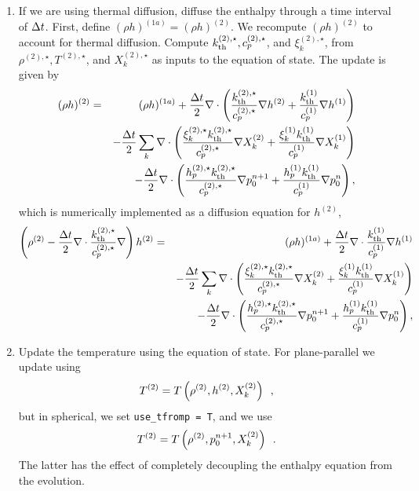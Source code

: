 \begin{description}
\begin{enumerate}
\item If we are using thermal diffusion, diffuse the enthalpy through a time interval of 
$\Delta t$.  First, define $(\rho h)^{(1a)} = (\rho h)^{(2)}$.  We recompute $(\rho h)^{(2)}$ to 
account for thermal diffusion.  Compute $k_{\rm th}^{(2),\star}, c_p^{(2),\star}$, and 
$\xi_k^{(2),\star}$, from $\rho^{(2),\star}, T^{(2),\star}$, and $X_k^{(2),\star}$ as inputs to 
the equation of state.  The update is given by
\begin{eqnarray}
(\rho h)^{(2)} &=& (\rho h)^{(1a)} + \frac{\Delta t}{2}\nabla\cdot\left(\frac{k_{\rm th}^{(2),\star}}{c_p^{(2),\star}}\nabla h^{(2)} + \frac{k_{\rm th}^{(1)}}{c_p^{(1)}}\nabla h^{(1)}\right)\nonumber\\
&&- \frac{\Delta t}{2}\sum_k\nabla\cdot\left(\frac{\xi_k^{(2),\star}k_{\rm th}^{(2),\star}}{c_p^{(2),\star}}\nabla X_k^{(2)} + \frac{\xi_k^{(1)}k_{\rm th}^{(1)}}{c_p^{(1)}}\nabla X_k^{(1)}\right)\nonumber\\
&&- \frac{\Delta t}{2}\nabla\cdot\left(\frac{h_p^{(2),\star}k_{\rm th}^{(2),\star}}{c_p^{(2),\star}}\nabla p_0^{n+1} + \frac{h_p^{(1)}k_{\rm th}^{(1)}}{c_p^{(1)}}\nabla p_0^{n}\right),
\end{eqnarray}
which is numerically implemented as a diffusion equation for $h^{(2)}$,
\begin{eqnarray}
\left(\rho^{(2)} - \frac{\Delta t}{2}\nabla\cdot\frac{k_{\rm th}^{(2),\star}}{c_p^{(2),\star}}\nabla\right)h^{(2)} &=& (\rho h)^{(1a)} + \frac{\Delta t}{2}\nabla\cdot\frac{k_{\rm th}^{(1)}}{c_p^{(1)}}\nabla h^{(1)}\nonumber\\
&&- \frac{\Delta t}{2}\sum_k\nabla\cdot\left(\frac{\xi_k^{(2),\star}k_{\rm th}^{(2),\star}}{c_p^{(2),\star}}\nabla X_k^{(2)} + \frac{\xi_k^{(1)}k_{\rm th}^{(1)}}{c_p^{(1)}}\nabla X_k^{(1)}\right)\nonumber\\
&&- \frac{\Delta t}{2}\nabla\cdot\left(\frac{h_p^{(2),\star}k_{\rm th}^{(2),\star}}{c_p^{(2),\star}}\nabla p_0^{n+1} + \frac{h_p^{(1)}k_{\rm th}^{(1)}}{c_p^{(1)}}\nabla p_0^{n}\right),
\end{eqnarray}
\item Update the temperature using the equation of state.  For plane-parallel we
update using
\begin{equation}
T^{(2)} = T\left(\rho^{(2)}, h^{(2)}, X_k^{(2)}\right) \enskip ,
\end{equation}
but in spherical, we set {\tt use\_tfromp = T}, and we use
\begin{equation}
T^{(2)} = T\left(\rho^{(2)}, p_0^{n+1}, X_k^{(2)}\right) \enskip .
\end{equation}
The latter has the effect of completely decoupling the enthalpy equation from the 
evolution.


\end{enumerate}
\end{description}
